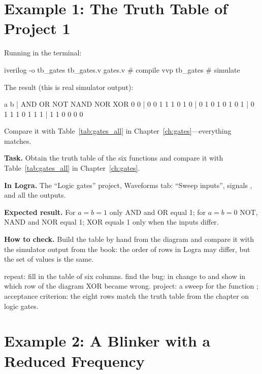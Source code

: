 \section{Example 1: The Truth Table of Project 1}


Running in the terminal:
\begin{vcode}[bash]
iverilog -o tb_gates tb_gates.v gates.v   # compile
vvp tb_gates                              # simulate
\end{vcode}

The result (this is real simulator output):
\begin{vcode}[text]
 a b | AND OR NOT NAND NOR XOR
 0 0 |  0   0   1    1    1   0
 1 0 |  0   1   0    1    0   1
 0 1 |  0   1   1    1    0   1
 1 1 |  1   1   0    0    0   0
\end{vcode}

Compare it with Table~\ref{tab:gates_all} in Chapter~\ref{ch:gates}---everything matches.

\begin{diybox}
\textbf{Task.} Obtain the truth table of the six functions and compare it with Table~\ref{tab:gates_all} in Chapter~\ref{ch:gates}.

\textbf{In Logra.} The ``Logic gates'' project, Waveforms tab: ``Sweep inputs'', signals ,  and all the outputs.

\textbf{Expected result.} For $a=b=1$ only AND and OR equal 1; for $a=b=0$ NOT, NAND and NOR equal 1; XOR equals 1 only when the inputs differ.

\textbf{How to check.} Build the table by hand from the diagram and compare it with the simulator output from the book: the order of rows in Logra may differ, but the set of values is the same.

 repeat: fill in the table of six columns.  find the bug: in  change \code{\textasciicircum} to \code{|} and show in which row of the diagram XOR became wrong.  project: a sweep for the function ; acceptance criterion: the eight rows match the truth table from the chapter on logic gates.
\end{diybox}

\section{Example 2: A Blinker with a Reduced Frequency}

